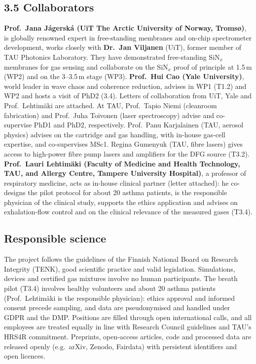 \documentclass[a4paper,12pt]{article}
\newcommand{\jc}[1]{\textcolor{dkrust}{#1}} %
\newcommand{\nc}[1]{\textcolor{dkleaf}{#1}} %
\begin{document}
\subsection*{3.5 Collaborators}

\textbf{Prof.~Jana Jágerská (UiT The Arctic University of Norway, Tromsø)}, is globally renowned expert in free-standing membranes and on-chip spectrometer development, works closely with \textbf{Dr.\ Jan Viljanen} (UiT), former member of TAU Photonics Laboratory. They have demonstrated free-standing SiN$_x$ membranes for gas sensing and collaborate on the SiN$_x$ proof of principle at 1.5\,\textmu{}m (WP2) and on the 3--3.5\,\textmu{}m stage (WP3). \textbf{Prof.\ Hui Cao (Yale University)}, world leader in wave chaos and coherence reduction, advises in WP1 (T1.2) and WP2 and hosts a visit of PhD2 (3.4). Letters of collaboration from UiT, Yale \jc{and Prof.\ Lehtimäki} are attached. At TAU, Prof.\ Tapio Niemi (cleanroom fabrication) and Prof.\ Juha Toivonen (laser spectroscopy) advise and co-supervise PhD1 and PhD2, respectively. \nc{Prof.\ Panu Karjalainen (TAU, aerosol physics) advises on the cartridge and gas handling, with in-house gas-cell expertise, and co-supervises MSc1.} \jc{Regina Gumenyuk (TAU, fibre lasers) gives access to high-power fibre pump lasers and amplifiers for the DFG source (T3.2).} \textbf{Prof.\ Lauri Lehtimäki (Faculty of Medicine and Health Technology, TAU, and Allergy Centre, Tampere University Hospital)}, a professor of respiratory medicine, acts as in-house clinical partner \jc{(letter attached): he co-designs the pilot protocol for about 20 asthma patients, is the responsible physician of the clinical study, supports the ethics application and advises on exhalation-flow control and on the clinical relevance of the measured gases (T3.4)}.

\subsection*{Responsible science}

The project follows the guidelines of the Finnish National Board on Research Integrity (TENK), good scientific practice and valid legislation. Simulations, devices and certified gas mixtures involve no human participants. The breath pilot (T3.4) involves healthy volunteers and about 20 asthma patients \jc{(Prof.~Lehtimäki is the responsible physician)}: ethics approval and informed consent precede sampling, and data are pseudonymised and handled under GDPR and the DMP. Positions are filled through open international calls, and all employees are treated equally in line with Research Council guidelines and TAU's HRS4R commitment. Preprints, open-access articles, code and processed data are released openly (e.g.\ arXiv, Zenodo, Fairdata) with persistent identifiers and open licences.
\end{document}
